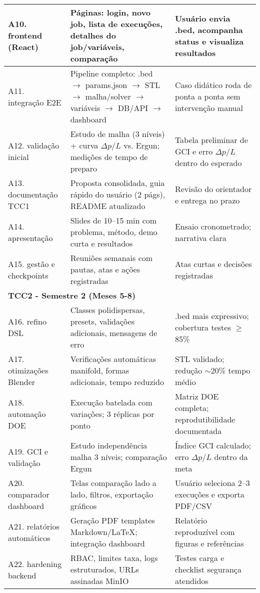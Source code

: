 \begin{landscape}
\begin{table}[htb]
{\begin{tabular}{p{6cm}p{10cm}p{8cm}}
\midrule
A10. frontend (React) & Páginas: login, novo job, lista de execuções, detalhes do job/variáveis, comparação & Usuário envia .bed, acompanha status e visualiza resultados \\
\midrule
A11. integração E2E & Pipeline completo: .bed $\rightarrow$ params.json $\rightarrow$ STL $\rightarrow$ malha/solver $\rightarrow$ variáveis $\rightarrow$ DB/API $\rightarrow$ dashboard & Caso didático roda de ponta a ponta sem intervenção manual \\
\midrule
A12. validação inicial & Estudo de malha (3 níveis) + curva $\Delta p/L$ vs. Ergun; medições de tempo de preparo & Tabela preliminar de GCI e erro $\Delta p/L$ dentro do esperado \\
\midrule
A13. documentação TCC1 & Proposta consolidada, guia rápido do usuário (2 págs), README atualizado & Revisão do orientador e entrega no prazo \\
\midrule
A14. apresentação & Slides de 10–15 min com problema, método, demo curta e resultados & Ensaio cronometrado; narrativa clara \\
\midrule
A15. gestão e checkpoints & Reuniões semanais com pautas, atas e ações registradas & Atas curtas e decisões registradas \\
\midrule
\multicolumn{3}{l}{\textbf{TCC2 - Semestre 2 (Meses 5-8)}} \\
\midrule
A16. refino DSL & Classes polidispersas, presets, validações adicionais, mensagens de erro & .bed mais expressivo; cobertura testes $\geq$ 85\% \\
\midrule
A17. otimizações Blender & Verificações automáticas manifold, formas adicionais, tempo reduzido & STL validado; redução $\sim$20\% tempo médio \\
\midrule
A18. automação DOE & Execução batelada com variações; 3 réplicas por ponto & Matriz DOE completa; reprodutibilidade documentada \\
\midrule
A19. GCI e validação & Estudo independência malha 3 níveis; comparação Ergun & Índice GCI calculado; erro $\Delta p/L$ dentro da meta \\
\midrule
A20. comparador dashboard & Telas comparação lado a lado, filtros, exportação gráficos & Usuário seleciona 2–3 execuções e exporta PDF/CSV \\
\midrule
A21. relatórios automáticos & Geração PDF templates Markdown/LaTeX; integração dashboard & Relatório reproduzível com figuras e referências \\
\midrule
A22. hardening backend & RBAC, limites taxa, logs estruturados, URLs assinadas MinIO & Testes carga e checklist segurança atendidos \\

\end{tabular}}
\end{table}
\end{landscape}
